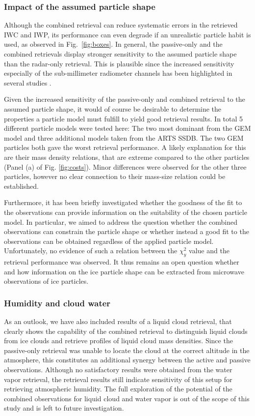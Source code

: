 \documentclass[journal abbreviation, manuscript]{copernicus}
\begin{document}
\subsubsection{Impact of the assumed particle shape}

Although the combined retrieval can reduce systematic errors in the retrieved
IWC and IWP, its performance can even degrade if an unrealistic particle habit
is used, as observed in Fig.~\ref{fig:boxes}. In general, the passive-only and
the combined retrievals display stronger sensitivity to the assumed particle shape
than the radar-only retrieval. This is plausible since the increased sensitivity
especially of the sub-millimeter radiometer channels has been highlighted
in several studies \cite{ekelund19}.

Given the increased sensitivity of the passive-only and combined retrieval to
the assumed particle shape, it would of course be desirable to determine the
properties a particle model must fulfill to yield good retrieval results. In
total 5 different particle models were tested here: The two most dominant from
the GEM model and three additional models taken from the ARTS SSDB. The two GEM
particles both gave the worst retrieval performance. A likely explanation for
this are their mass density relations, that are extreme compared to the other
particles (Panel (a) of Fig. \ref{fig:costs}). Minor differences were observed
for the other three particles, however no clear connection to their mass-size
relation could be established.

Furthermore, it has been briefly investigated whether the goodness of the fit to
the observations can provide information on the suitability of the chosen
particle model. In particular, we aimed to address the question whether the
combined observations can constrain the particle shape or whether instead a good
fit to the observations can be obtained regardless of the applied particle
model. Unfortunately, no evidence of such a relation between the $\chi^2_y$ value
and the retrieval performance was observed. It thus remains an open question
whether and how information on the ice particle shape can be extracted from
microwave observations of ice particles.

\subsubsection{Humidity and cloud water}

As an outlook, we have also included results of a liquid cloud retrieval, that
clearly shows the capability of the combined retrieval to distinguish liquid
clouds from ice clouds and retrieve profiles of liquid cloud mass densities.
Since the passive-only retrieval was unable to locate the cloud at the correct
altitude in the atmosphere, this constitutes an additional synergy between the
active and passive observations. Although no satisfactory results were obtained
from the water vapor retrieval, the retrieval results still indicate sensitivity
of this setup for retrieving atmospheric humidity. The full exploration of the
potential of the combined observations for liquid cloud and water vapor is out
of the scope of this study and is left to future investigation.
\end{document}
